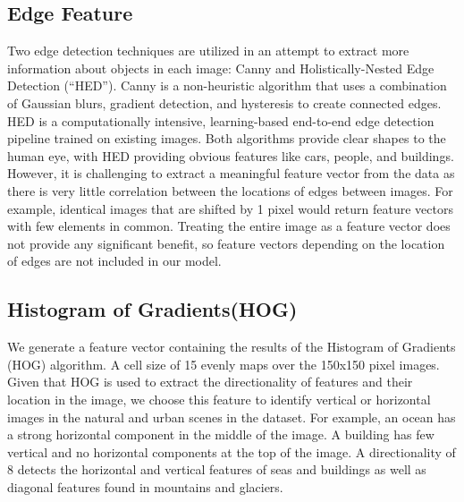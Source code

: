 \documentclass[11pt]{article}
\begin{document}
\subsection{Edge Feature}
Two edge detection techniques are utilized in an attempt to extract more information about objects in each image: Canny\cite{Canny1986} and Holistically-Nested Edge Detection (“HED”)\cite{XieTu2015}. Canny is a non-heuristic algorithm that uses a combination of Gaussian blurs, gradient detection, and hysteresis to create connected edges. HED is a computationally intensive, learning-based end-to-end edge detection pipeline trained on existing images. Both algorithms provide clear shapes to the human eye, with HED providing obvious features like cars, people, and buildings. However, it is challenging to extract a meaningful feature vector from the data as there is very little correlation between the locations of edges between images. For example, identical images that are shifted by 1 pixel would return feature vectors with few elements in common. Treating the entire image as a feature vector does not provide any significant benefit, so feature vectors depending on the location of edges are not included in our model.

\subsection{Histogram of Gradients(HOG)}
We generate a feature vector containing the results of the Histogram of Gradients (HOG) algorithm\cite{DalalTriggs2005}. A cell size of 15 evenly maps over the 150x150 pixel images. Given that HOG is used to extract the directionality of features and their location in the image, we choose this feature to identify vertical or horizontal images in the natural and urban scenes in the dataset. For example, an ocean has a strong horizontal component in the middle of the image. A building has few vertical and no horizontal components at the top of the image. A directionality of 8 detects the horizontal and vertical features of seas and buildings as well as diagonal features found in mountains and glaciers. 
\end{document}
